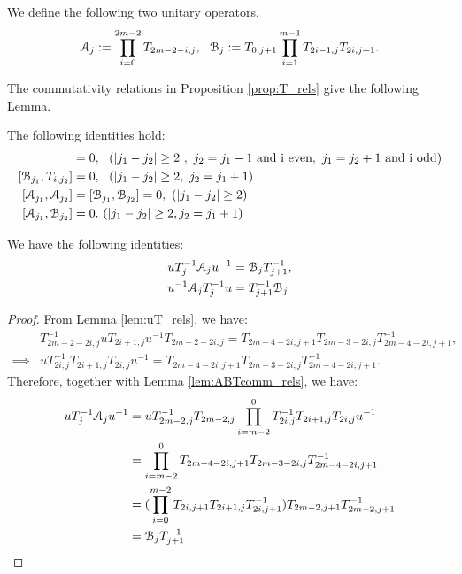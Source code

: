\documentclass{amsart}
\begin{document}
\begin{defn}
We define the following two unitary operators,
\[
\AA_j:=\prod^{2m-2}_{i=0}T_{2m-2-i,j},\ \ \BB_{j}:=T_{0,j+1}\prod^{m-1}_{i=1}T_{2i-1,j}T_{2i,j+1}.
\] 
\end{defn}

The commutativity relations in Proposition \ref{prop:T_rels} give the following Lemma.
\begin{lem}\label{lem:ABTcomm_rels}
The following identities hold:
\begin{align}
[\AA_{j_1},T_{i,{j_2}}]&=0, \ \ (|j_1-j_2|\geq 2\ , \ j_2=j_1-1\ \text{and i even},\ j_1=j_2+1\ 
\text{and i odd})\\
[\BB_{j_1},T_{i,{j_2}}]&=0, \ \ (|j_1-j_2|\geq 2,\  j_2=j_1+1)\\
[\AA_{j_1},\AA_{j_2}]&=[\BB_{j_1},\BB_{j_2}]=0,\ (|j_1-j_2|\geq 2)\\
[\AA_{j_1},\BB_{j_2}]&=0.\ (|j_1-j_2|\geq 2,j_2=j_1+1)
\end{align}
\end{lem}

\begin{lem}\label{lem:utAB_rels}
We have the following identities:
\begin{align}
uT^{-1}_j\mathcal{A}_ju^{-1}&=\mathcal{B}_jT^{-1}_{j+1}, \\ 
u^{-1}\mathcal{A}_jT^{-1}_ju&=T^{-1}_{j+1}\mathcal{B}_j
\end{align}
     
\end{lem}
\begin{proof}
From Lemma \ref{lem:uT_rels}, we have: 
\[
\begin{aligned}
&T^{-1}_{2m-2-2i,j}uT_{2i+1,j}u^{-1}T_{2m-2-2i,j}=T_{2m-4-2i,j+1}T_{2m-3-2i,j}T^{-1}_{2m-4-2i,j+1},\\
\implies &uT^{-1}_{2i,j}T_{2i+1,j}T_{2i,j}u^{-1}=T_{2m-4-2i,j+1}T_{2m-3-2i,j}T^{-1}_{2m-4-2i,j+1}.
\end{aligned}
\]
Therefore, together with Lemma \ref{lem:ABTcomm_rels}, we have:
\[
\begin{aligned}
uT^{-1}_j\mathcal{A}_ju^{-1}&=uT^{-1}_{2m-2,j}T_{2m-2,j}\prod_{i=m-2}^{0}T^{-1}_{2i,j}T_{2i+1,j}T_{2i,j}u^{-1}\\
&=\prod_{i=m-2}^{0}T_{2m-4-2i,j+1}T_{2m-3-2i,j}T^{-1}_{2m-4-2i,j+1}\\
&=(\prod_{i=0}^{m-2}T_{2i,j+1}T_{2i+1,j}T^{-1}_{2i,j+1})T_{2m-2,j+1}T^{-1}_{2m-2,j+1}\\
&=\mathcal{B}_jT^{-1}_{j+1}     
\end{aligned}
\]
\end{proof}
\end{document}

